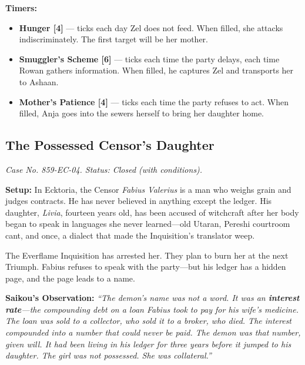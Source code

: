 \textbf{Timers:}
\begin{itemize}
  \item \textbf{Hunger [4]} --- ticks each day Zel does not feed. When filled, she attacks indiscriminately. The first target will be her mother.
  \item \textbf{Smuggler's Scheme [6]} --- ticks each time the party delays, each time Rowan gathers information. When filled, he captures Zel and transports her to Ashaan.
  \item \textbf{Mother's Patience [4]} --- ticks each time the party refuses to act. When filled, Anja goes into the sewers herself to bring her daughter home.
\end{itemize}

\subsection{The Possessed Censor's Daughter}

\emph{Case No. 859-EC-04. Status: Closed (with conditions).}

\textbf{Setup:} In Ecktoria, the Censor \emph{Fabius Valerius} is a man who weighs grain and judges contracts. He has never believed in anything except the ledger. His daughter, \emph{Livia}, fourteen years old, has been accused of witchcraft after her body began to speak in languages she never learned---old Utaran, Pereshi courtroom cant, and once, a dialect that made the Inquisition's translator weep.

The Everflame Inquisition has arrested her. They plan to burn her at the next Triumph. Fabius refuses to speak with the party---but his ledger has a hidden page, and the page leads to a name.

\textbf{Saikou's Observation:} \emph{``The demon's name was not a word. It was an \textbf{interest rate}---the compounding debt on a loan Fabius took to pay for his wife's medicine. The loan was sold to a collector, who sold it to a broker, who died. The interest compounded into a number that could never be paid. The demon was that number, given will. It had been living in his ledger for three years before it jumped to his daughter. The girl was not possessed. She was collateral.''}

